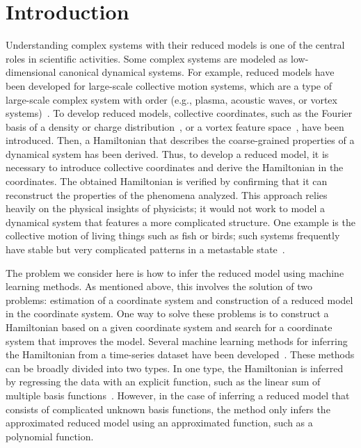 \documentclass[preprint,
bibnotes,
 amsmath,amssymb,
 aps,
]{revtex4-1}
\begin{document}
\section{Introduction}
Understanding complex systems with their reduced models is one of the central roles in scientific activities. 
Some complex systems are modeled as low-dimensional canonical dynamical systems. 
For example, reduced models have been developed for large-scale collective motion systems, which are a type of large-scale complex system with order (e.g., plasma, acoustic waves, or vortex systems)~\cite{Tomonaga:1950zz, bohm1951collective, pines1952collective, tomonaga1955elementary, saffman1992vortex}. 
To develop reduced models, collective coordinates, such as the Fourier basis of a density or charge distribution~\cite{Tomonaga:1950zz, bohm1951collective, pines1952collective, tomonaga1955elementary}, or a vortex feature space~\cite{saffman1992vortex}, have been introduced. 
Then, a Hamiltonian that describes the coarse-grained properties of a dynamical system has been derived. 
Thus, to develop a reduced model, it is necessary to introduce collective coordinates and derive the Hamiltonian in the coordinates. 
The obtained Hamiltonian is verified by confirming that it can reconstruct the properties of the phenomena analyzed. 
This approach relies heavily on the physical insights of physicists; it would not work to model a dynamical system that features a more complicated structure. One example is the collective motion of living things such as fish or birds; such systems frequently have stable but very complicated patterns in a metastable state~\cite{vicsek2012collective, ikegami2017life}.\par
The problem we consider here is how to infer the reduced model using machine learning methods. 
As mentioned above, this involves the solution of two problems: estimation of a coordinate system and construction of a reduced model in the coordinate system. 
One way to solve these problems is to construct a Hamiltonian based on a given coordinate system and search for a coordinate system that improves the model. 
Several machine learning methods for inferring the Hamiltonian from a time-series dataset have been developed~\cite{schmidt2009distilling, NIPS2019_9672, toth2019hamiltonian, bondesan2019learning}. 
These methods can be broadly divided into two types. 
In one type, the Hamiltonian is inferred by regressing the data with an explicit function, such as the linear sum of multiple basis functions~\cite{schmidt2009distilling}. 
However, in the case of inferring a reduced model that consists of complicated unknown basis functions, the method only infers the approximated reduced model using an approximated function, such as a polynomial function.  
\end{document}

